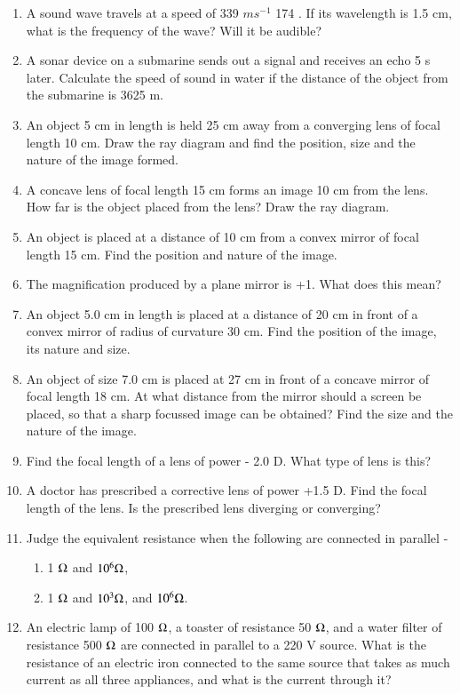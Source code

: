 \begin{enumerate}[label=\arabic*.,ref=\thesection.\theenumi]
\item  A sound wave travels at a speed of 339 $m s^{-1}$ 174 . If its
wavelength is 1.5 cm, what is the frequency of the wave? Will it be audible?
\item A sonar device on a submarine sends out a signal and receives an echo 5 s later. Calculate the speed of sound in water if the distance of the object from the submarine is 3625 m.
\item An object 5 cm in length is held 25 cm away from a converging lens of focal length 10 cm. Draw the ray diagram and find the position, size and the nature of the image formed.
\item  A concave lens of focal length 15 cm forms an image 10 cm from the lens. How far is the object placed from the lens? Draw the ray diagram.
\item  An object is placed at a distance of 10 cm from a convex mirror of focal length 15 cm. Find the position and nature of the image.
\item  The magnification produced by a plane mirror is +1. What does this mean? 
\item  An object 5.0 cm in length is placed at a distance of 20 cm in front of a convex mirror of radius of curvature 30 cm. Find the position of the image, its nature and size.
\item  An object of size 7.0 cm is placed at 27 cm in front of a concave mirror of focal length 18 cm. At what distance from the mirror should a screen be placed, so that a sharp focussed image can be obtained? Find the size and the nature of the image.
\item  Find the focal length of a lens of power - 2.0 D. What type of lens is this? 
\item  A doctor has prescribed a corrective lens of power +1.5 D. Find the focal length of the lens. Is the prescribed lens diverging or converging?
\item  Judge the equivalent resistance when the following are connected in parallel - 
\begin{enumerate} \item 1 $\ohm $ and $10^6 \ohm $, \item1 $\ohm $ and $10^3 \ohm$, and $10^6 \ohm$.\end{enumerate}
\item An electric lamp of 100 $\ohm$, a toaster of resistance 50 $\ohm$, and a water filter of resistance 500 $\ohm $ are connected in parallel to a 220 V source. What is the resistance of an electric iron connected to the same source that takes as much current as all three appliances, and what is the current through it?

\end{enumerate}
